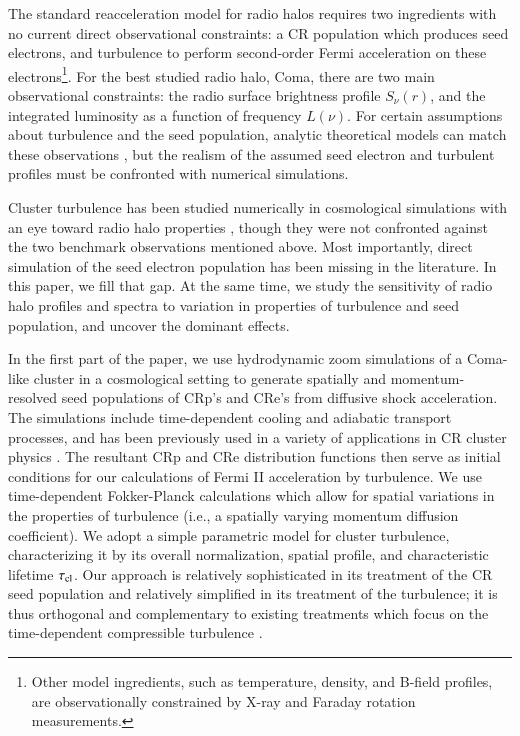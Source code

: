 \documentclass[fleqn,usenatbib,useAMS]{mnras}
\begin{document}
The standard reacceleration model for radio halos requires two ingredients with
no current direct observational constraints: a CR population which produces seed
electrons, and turbulence to perform second-order Fermi acceleration on these
electrons\footnote{Other model ingredients, such as temperature, density, and
  B-field profiles, are observationally constrained by X-ray and Faraday
  rotation measurements.}. For the best studied radio halo, Coma, there are two
main observational constraints: the radio surface brightness profile
$S_{\nu}(r)$, and the integrated luminosity as a function of frequency
$L(\nu)$. For certain assumptions about turbulence and the seed population,
analytic theoretical models can match these observations \citep{brunetti11}, but
the realism of the assumed seed electron and turbulent profiles must be
confronted with numerical simulations.

Cluster turbulence has been studied numerically in cosmological simulations with
an eye toward radio halo properties \citep{2013ApJ...771..131B,
  miniati15}, though they were not confronted against the two
benchmark observations mentioned above. Most importantly, direct simulation of the
seed electron population has been missing in the literature. In this paper, we
fill that gap. At the same time, we study the sensitivity of radio halo profiles
and spectra to variation in properties of turbulence and seed population, and
uncover the dominant effects.

In the first part of the paper, we use hydrodynamic zoom simulations of a Coma-like cluster in a cosmological setting to generate spatially and momentum-resolved seed populations of CRp's and CRe's from diffusive shock acceleration. The simulations include time-dependent cooling and adiabatic transport processes, and has been previously used in a variety of applications in CR cluster physics \citep{pinzke10,pinzke13}. The resultant CRp and CRe distribution functions then serve as initial conditions for our calculations of Fermi II acceleration by turbulence. We use time-dependent Fokker-Planck calculations which allow for spatial variations in the properties of turbulence (i.e., a spatially varying momentum diffusion coefficient). We adopt a simple parametric model for 
cluster turbulence, characterizing it by its overall normalization, spatial profile, and characteristic lifetime $\tau_{\rm cl}$. Our approach is relatively sophisticated in its treatment of the CR seed population and relatively simplified in its treatment of the turbulence; it is thus orthogonal and complementary to existing treatments which focus on the time-dependent compressible turbulence \citep{miniati15}.
\end{document}
